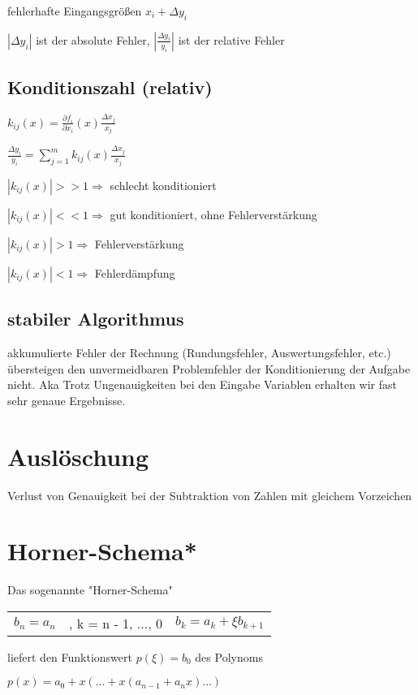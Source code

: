 \documentclass[12pt,a4paper]{article} %
\begin{document}
	fehlerhafte Eingangsgrößen $x_i + \Delta y_i$
	
	$|\Delta y_i|$ ist der absolute Fehler, $|\frac{\Delta y_i}{y_i}|$ ist der relative Fehler
	
	\subsection{Konditionszahl (relativ)}
	
	$k_{ij}(x) = \frac{\partial f_i}{\partial x_i}(x) \frac{\Delta x_j}{x_j}$
	
	$\frac{\Delta y_i}{y_i} = \sum\limits_{j = 1}^{m}k_{ij}(x)\frac{\Delta x_j}{x_j}$
	
	$|k_{ij}(x)| >> 1 \Rightarrow$ schlecht konditioniert
	
	$|k_{ij}(x)| << 1 \Rightarrow$ gut konditioniert, ohne Fehlerverstärkung
	
	$|k_{ij}(x)| > 1 \Rightarrow$ Fehlerverstärkung
	
	$|k_{ij}(x)| < 1 \Rightarrow$ Fehlerdämpfung
	
	\subsection{stabiler Algorithmus}
	
	akkumulierte Fehler der Rechnung (Rundungsfehler, Auswertungsfehler, etc.) übersteigen den unvermeidbaren Problemfehler der Konditionierung der Aufgabe nicht. Aka Trotz Ungenauigkeiten bei den Eingabe Variablen erhalten wir fast sehr genaue Ergebnisse.
	
	\section{Auslöschung}
	
	Verlust von Genauigkeit bei der Subtraktion von Zahlen mit gleichem Vorzeichen
	
	\section{Horner-Schema*}
	
	Das sogenannte "Horner-Schema"
	
	\begin{tabular}{l l l}
		$b_n = a_n$ &, k = n - 1, ..., 0 & $b_k = a_k + \xi b_{k + 1} $
	\end{tabular}
	liefert den Funktionswert $p(\xi) = b_0$ des Polynoms
			
	$p(x) = a_0 + x(... + x(a_{n-1} + a_nx)...)$
	
\end{document}
